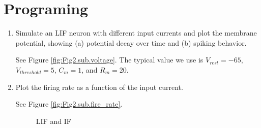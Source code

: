 \documentclass[11pt]{article}
\begin{document}
	\section*{Programing}
	\begin{enumerate}
		\item Simulate an LIF neuron with different input currents and plot the membrane potential, showing (a) potential decay over time and (b) spiking behavior.

		See Figure \ref{fig:Fig2.sub.voltage}. The typical value we use is $V_{rest} = -65$, $V_{threshold} = 5$, $C_m = 1$, and $R_m = 20$. 
		
		\item Plot the firing rate as a function of the input current.
		
		See Figure \ref{fig:Fig2.sub.fire_rate}.
		
		\begin{figure}[htb]
			\centering
			\caption{LIF and IF}
		\end{figure}
		

\end{enumerate}
\end{document}
